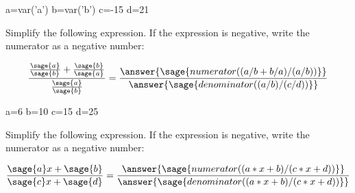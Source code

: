 \documentclass{ximera}
\begin{document}
\begin{problem}
\begin{sagesilent}
a=var('a')
b=var('b')
c=-15
d=21
\end{sagesilent}
Simplify the following expression.  If the expression is negative, write the numerator as a negative number:
\begin{prompt}
$$\frac{\frac{\sage{a}}{\sage{b}}+\frac{\sage{b}}{\sage{a}}}{\frac{\sage{a}}{\sage{b}}}=\frac{\answer{\sage{numerator((a/b+b/a)/(a/b))}}}{\answer{\sage{denominator((a/b)/(c/d))}}}$$
\end{prompt}
\end{problem}

\begin{problem}
\begin{sagesilent}
a=6
b=10
c=15
d=25
\end{sagesilent}
Simplify the following expression.  If the expression is negative, write the numerator as a negative number:
\begin{prompt}
$$\frac{\sage{a}x+\sage{b}}{\sage{c}x+\sage{d}}=\frac{\answer{\sage{numerator((a*x+b)/(c*x+d))}}}{\answer{\sage{denominator((a*x+b)/(c*x+d))}}}$$
\end{prompt}
\end{problem}
\end{document}
